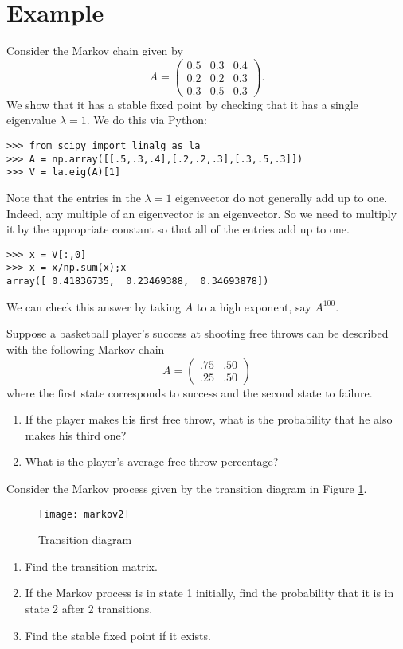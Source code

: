 \section*{Example}
Consider the Markov chain given by
\[
A = \begin{pmatrix}
0.5 & 0.3 & 0.4\\
0.2 & 0.2 & 0.3\\
0.3 & 0.5 & 0.3
\end{pmatrix}.
\]
We show that it has a stable fixed point by checking that it has a single eigenvalue $\lambda=1$.
We do this via Python:
\begin{lstlisting}
>>> from scipy import linalg as la
>>> A = np.array([[.5,.3,.4],[.2,.2,.3],[.3,.5,.3]])
>>> V = la.eig(A)[1]
\end{lstlisting}
Note that the entries in the $\lambda=1$ eigenvector do not generally add up to one.
Indeed, any multiple of an eigenvector is an eigenvector.
So we need to multiply it by the appropriate constant so that all of the entries add up to one.
\begin{lstlisting}
>>> x = V[:,0]
>>> x = x/np.sum(x);x
array([ 0.41836735,  0.23469388,  0.34693878])
\end{lstlisting}
We can check this answer by taking $A$ to a high exponent, say $A^{100}$.

\begin{problem}
Suppose a basketball player's success at shooting free throws can be described with the following Markov chain
\[
A = \begin{pmatrix}.75&.50\\.25&.50\end{pmatrix}
\]
where the first state corresponds to success and the second state to failure.
\begin{enumerate}
\item If the player makes his first free throw, what is the probability that he also makes his third one?
\item What is the player's average free throw percentage?
\end{enumerate}
\end{problem}

\begin{problem}
Consider the Markov process given by the transition diagram in Figure \ref{fig:markov2}.
\begin{figure}[H]
\texttt{[image: markov2]}
\caption{Transition diagram}
\label{fig:markov2}
\end{figure}

\begin{enumerate}
\item Find the transition matrix.
\item If the Markov process is in state 1 initially, find the probability that it is in state 2 after 2 transitions.
\item Find the stable fixed point if it exists.
\end{enumerate}
\end{problem}

